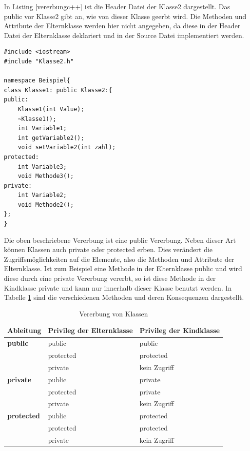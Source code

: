 In Listing \ref{vererbungc++} ist die Header Datei der Klasse2 dargestellt. Das  \glqq public\grqq{} vor Klasse2 gibt an, wie von dieser Klasse geerbt wird. Die Methoden und Attribute der Elternklasse werden hier nicht angegeben, da diese in der Header Datei der Elternklasse deklariert und in der Source Datei implementiert werden.
\begin{lstlisting}[caption =Vererbung in C++,label=vererbungc++]
#include <iostream>
#include "Klasse2.h"

namespace Beispiel{
class Klasse1: public Klasse2:{
public:
	Klasse1(int Value);
	~Klasse1();
	int Variable1;
	int getVariable2();
	void setVariable2(int zahl);
protected:
	int Variable3;
	void Methode3();
private:
	int Variable2;
	void Methode2();
};
}
\end{lstlisting}
Die oben beschriebene Vererbung ist eine \glqq public\grqq{} Vererbung. Neben dieser Art können Klassen auch \glqq private\grqq{} oder \glqq protected\grqq{} erben. Dies verändert die Zugriffsmöglichkeiten auf die Elemente, also die Methoden und Attribute der Elternklasse.
Ist zum Beispiel eine Methode in der Elternklasse  \glqq public\grqq{} und wird diese durch eine \glqq private\grqq{} Vererbung vererbt, so ist diese Methode in der Kindklasse \glqq private\grqq{} und kann nur innerhalb dieser Klasse benutzt werden.
In Tabelle \ref{vererbungKlassen} sind die verschiedenen Methoden und deren Konsequenzen dargestellt.
\begin{table}[H]
	\centering
	\begin{tabular}{|l|l|l|}
		\hline
		\textbf{Ableitung} & \textbf{Privileg der Elternklasse} & \textbf{Privileg der Kindklasse} \\ \hline
		\textbf{public}   & public                             & public                           \\ \hline
		& protected                          & protected                        \\ \hline
		& private                            & kein Zugriff                     \\ \hline
		\textbf{private}   & public                             & private                          \\ \hline
		& protected                          & private                          \\ \hline
		& private                            & kein Zugriff                     \\ \hline
		\textbf{protected} & public                             & protected                        \\ \hline
		& protected                          & protected                        \\ \hline
		& private                            & kein Zugriff                     \\ \hline
	\end{tabular}
\caption[Vererbung von Klassen]{Vererbung von Klassen}
\label{vererbungKlassen}
\end{table}
